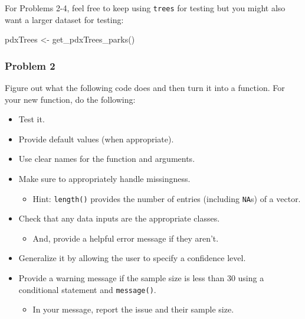 \documentclass[
]{article}
\newenvironment{Shaded}{\begin{snugshade}}{\end{snugshade}}
\newcommand{\FunctionTok}[1]{\textcolor[rgb]{0.00,0.00,0.00}{#1}}
\newcommand{\NormalTok}[1]{#1}
\newcommand{\OtherTok}[1]{\textcolor[rgb]{0.56,0.35,0.01}{#1}}
\providecommand{\tightlist}{%
  \setlength{\itemsep}{0pt}\setlength{\parskip}{0pt}}
\begin{document}
For Problems 2-4, feel free to keep using \texttt{trees} for testing but
you might also want a larger dataset for testing:

\begin{Shaded}
\begin{Highlighting}[]
\NormalTok{pdxTrees }\OtherTok{\textless{}{-}} \FunctionTok{get\_pdxTrees\_parks}\NormalTok{()}
\end{Highlighting}
\end{Shaded}

\hypertarget{problem-2}{%
\subsubsection{Problem 2}\label{problem-2}}

Figure out what the following code does and then turn it into a
function. For your new function, do the following:

\begin{itemize}
\tightlist
\item
  Test it.
\item
  Provide default values (when appropriate).
\item
  Use clear names for the function and arguments.
\item
  Make sure to appropriately handle missingness.

  \begin{itemize}
  \tightlist
  \item
    Hint: \texttt{length()} provides the number of entries (including
    \texttt{NA}s) of a vector.\\
  \end{itemize}
\item
  Check that any data inputs are the appropriate classes.

  \begin{itemize}
  \tightlist
  \item
    And, provide a helpful error message if they aren't.
  \end{itemize}
\item
  Generalize it by allowing the user to specify a confidence level.
\item
  Provide a warning message if the sample size is less than 30 using a
  conditional statement and \texttt{message()}.

  \begin{itemize}
  \tightlist
  \item
    In your message, report the issue and their sample size.
  \end{itemize}
\end{itemize}
\end{document}
